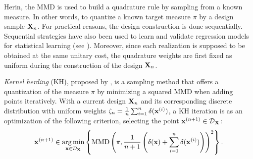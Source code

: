 Herin, the MMD is used to build a quadrature rule by sampling from a known measure. 
In other words, to quantize a known target measure $\pi$ by a design sample ${\bf X}_n$. 
For practical reasons, the design construction is done sequentially. 
Sequential strategies have also been used to learn and validate regression models for statistical learning (see \cite{fekhari_iooss_2023}). 
Moreover, since each realization is supposed to be obtained at the same unitary cost, the quadrature weights are first fixed as uniform during the construction of the design ${\bf X}_n$.

\emph{Kernel herding} (KH), proposed by \cite{chen_welling_2010}, is a sampling method that offers a quantization of the measure $\pi$ by minimizing a squared MMD when adding points iteratively. 
With a current design ${\bf X}_n$ and its corresponding discrete distribution with uniform weights $\zeta_n= \frac{1}{n} \sum_{i=1}^{n} \delta({\bf x}^{(i)})$, a KH iteration is as an optimization of the following criterion, selecting the point ${\bf x}^{(n+1)} \in \mathcal{D}_{{\bf X}}$:
\begin{align}
   {\bf x}^{(n+1)} \in \operatorname*{arg\,min}_{{\bf x} \in \mathcal{D}_{{\bf X}}} \left\{\mathrm{MMD}\left(\pi, \frac{1}{n+1} \left(\delta({\bf x}) + \sum_{i=1}^{n} \delta({\bf x}^{(i)})\right)\right)^2\right\}.
   \label{eq:mmd_criterion}
\end{align}

